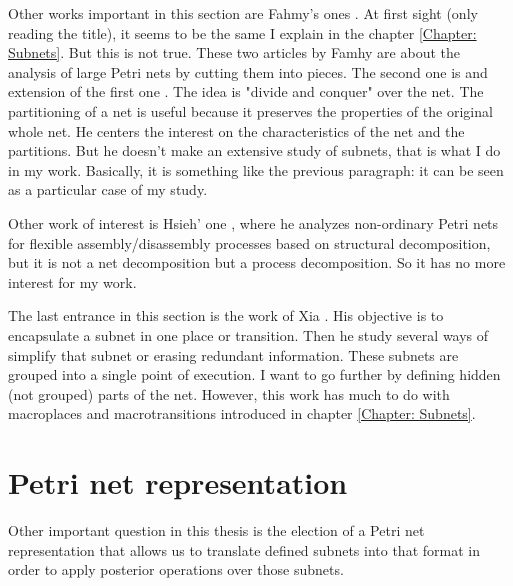 Other works important in this section are Fahmy's ones \cite{SN-Fahmy1990321,SN-Fahmy1993127}.
At first sight (only reading the title), it seems to be the same I explain in the chapter \ref{Chapter: Subnets}. But
this is not true. These two articles by Famhy are about the analysis of large Petri nets by cutting them into pieces. The second one \cite{SN-Fahmy1993127} is and extension of the first one \cite{SN-Fahmy1990321}. The idea is "divide
and conquer" over the net. The partitioning of a net is useful because it preserves the properties of the original whole net. He centers the interest
on the characteristics of the net and the partitions. But he doesn't make an extensive study of subnets, that is what I do in my work. Basically, it is something like the previous paragraph: it can be seen as a particular case of my study. 

Other work of interest is Hsieh' one \cite{G-PROP-Hsieh2011496}, where he
analyzes non-ordinary Petri nets for flexible assembly/disassembly processes
based on structural decomposition, but it is not a net decomposition but a process decomposition. So it has no more interest for my work. 

The last entrance in this section is the work of Xia \cite{R-Xia20111662}. His objective is to encapsulate a subnet
in one place or transition. Then he study several ways of simplify that subnet
or erasing
redundant information. These subnets are grouped into a single point of execution. I want to go further by defining hidden (not grouped) parts of the net. However, this work  has much to do with macroplaces and macrotransitions  introduced in chapter \ref{Chapter: Subnets}.
\section{Petri net representation}

Other important question in this thesis is the election of a Petri net representation
that allows us to translate defined subnets into that format in order to
apply posterior operations over those subnets.

